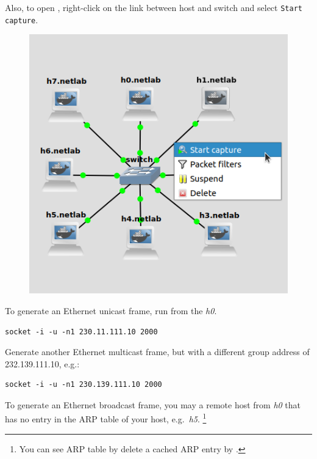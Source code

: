 \documentclass{../UTNetLab}
\begin{document}
Also, to open , right-click on the link between host and switch and select \texttt{Start capture}.
\begin{figure}[H]
    \centering
    \includegraphics[scale=1.8]{img/capture}
\end{figure}

To generate an Ethernet unicast frame, run  from the \textit{h0}.

\begin{lstlisting}[emph={your-host, remote-host}]
socket -i -u -n1 230.11.111.10 2000
\end{lstlisting}

Generate another Ethernet multicast frame, but with a different group address of {232.139.111.10}, e.g.:

\begin{lstlisting}[emph={your-host, remote-host}]
socket -i -u -n1 230.139.111.10 2000
\end{lstlisting}


To generate an Ethernet broadcast frame, you may  a remote host from \textit{h0} that has no entry in the ARP table of your host, e.g.\ \textit{h5}.
\footnote{You can see ARP table by  delete a cached ARP entry by .}
\end{document}
